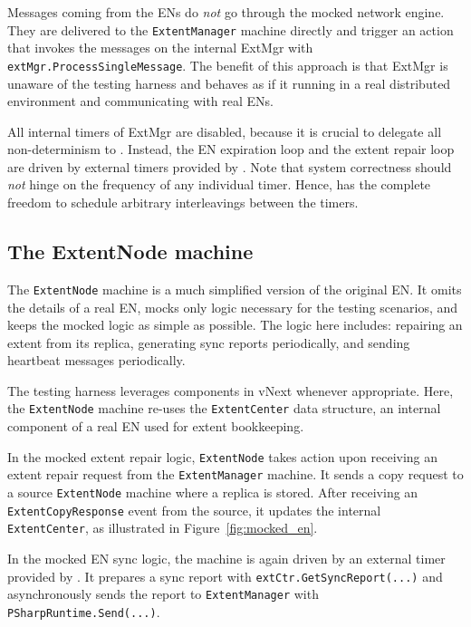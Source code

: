 Messages coming from the ENs do {\em not} go through the mocked network engine. They are delivered to the \texttt{ExtentManager} machine directly and trigger an action that invokes the messages on the internal ExtMgr with \texttt{extMgr.ProcessSingleMessage}. The benefit of this approach is that ExtMgr is unaware of the testing harness and behaves as if it running in a real distributed environment and communicating with real ENs.

All internal timers of ExtMgr are disabled, because it is crucial to delegate all non-determinism to \psharp. Instead, the EN expiration loop and the extent repair loop are driven by external timers provided by \psharp. Note that system correctness should {\em not} hinge on the frequency of any individual timer. Hence, \psharp has the complete freedom to schedule arbitrary interleavings between the timers.

\subsection{The ExtentNode machine}
\label{sec:method:mock_en}

The \texttt{ExtentNode} machine is a much simplified version of the original EN. It omits the details of a real EN, mocks only logic necessary for the testing scenarios, and keeps the mocked logic as simple as possible. The logic here includes: repairing an extent from its replica, generating sync reports periodically, and sending heartbeat messages periodically.

The testing harness leverages components in vNext whenever appropriate. Here, the \texttt{ExtentNode} machine re-uses the \texttt{ExtentCenter} data structure, an internal component of a real EN used for extent bookkeeping.

In the mocked extent repair logic, \texttt{ExtentNode} takes action upon receiving an extent repair request from the \texttt{ExtentManager} machine. It sends a copy request to a source \texttt{ExtentNode} machine where a replica is stored. After receiving an \texttt{ExtentCopyResponse} event from the source, it updates the internal \texttt{ExtentCenter}, as illustrated in Figure~\ref{fig:mocked_en}. 

In the mocked EN sync logic, the machine is again driven by an external timer provided by \psharp. It prepares a sync report with \texttt{extCtr.GetSyncReport(...)} and asynchronously sends the report to \texttt{ExtentManager} with \texttt{PSharpRuntime.Send(...)}.

